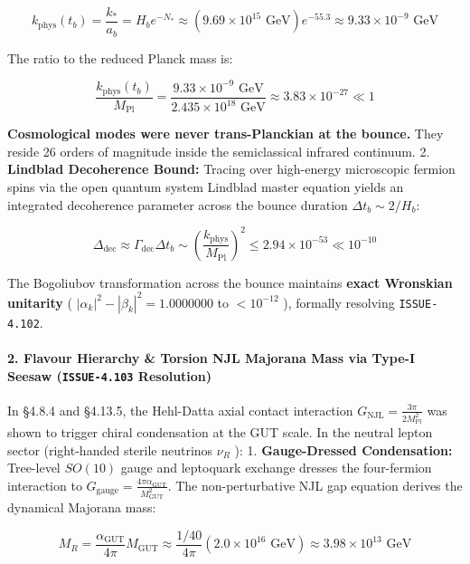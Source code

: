 \documentclass[11pt,a4paper]{article}
\theoremstyle{definition}\newtheorem{definition}{Definition}
\theoremstyle{remark}\newtheorem{remark}{Remark}
\begin{document}
\begin{equation}
k_{\text{phys}}(t_b) = \frac{k_*}{a_b} = H_b e^{-N_*} \approx (9.69 \times 10^{15}\text{ GeV}) e^{-55.3} \approx 9.33 \times 10^{-9}\text{ GeV}
\end{equation}


The ratio to the reduced Planck mass is:


\begin{equation}
\frac{k_{\text{phys}}(t_b)}{M_{\text{Pl}}} = \frac{9.33 \times 10^{-9}\text{ GeV}}{2.435 \times 10^{18}\text{ GeV}} \approx 3.83 \times 10^{-27} \ll 1
\end{equation}


\textbf{Cosmological modes were never trans-Planckian at the bounce.} They reside 26 orders of magnitude inside the semiclassical infrared continuum.
2. \textbf{Lindblad Decoherence Bound:} Tracing over high-energy microscopic fermion spins via the open quantum system Lindblad master equation yields an integrated decoherence parameter across the bounce duration $\Delta t_b \sim 2/H_b$:


\begin{equation}
\Delta_{\text{dec}} \approx \Gamma_{\text{dec}} \Delta t_b \sim \left(\frac{k_{\text{phys}}}{M_{\text{Pl}}}\right)^2 \le 2.94 \times 10^{-53} \ll 10^{-10}
\end{equation}


The Bogoliubov transformation across the bounce maintains \textbf{exact Wronskian unitarity} ( $|\alpha_k|^2 - |\beta_k|^2 = 1.0000000$ to $< 10^{-12}$ ), formally resolving \texttt{ISSUE-4.102}.
\paragraph{2. Flavour Hierarchy \& Torsion NJL Majorana Mass via Type-I Seesaw (\texttt{ISSUE-4.103} Resolution)}

In §4.8.4 and §4.13.5, the Hehl-Datta axial contact interaction $G_{\text{NJL}} = \frac{3\pi}{2 M_{\text{Pl}}^2}$ was shown to trigger chiral condensation at the GUT scale. In the neutral lepton sector (right-handed sterile neutrinos $\nu_R$ ):
1. \textbf{Gauge-Dressed Condensation:} Tree-level $SO(10)$ gauge and leptoquark exchange dresses the four-fermion interaction to $G_{\text{gauge}} = \frac{4\pi \alpha_{\text{GUT}}}{M_{\text{GUT}}^2}$. The non-perturbative NJL gap equation derives the dynamical Majorana mass:


\begin{equation}
M_R = \frac{\alpha_{\text{GUT}}}{4\pi} M_{\text{GUT}} \approx \frac{1/40}{4\pi} (2.0 \times 10^{16}\text{ GeV}) \approx 3.98 \times 10^{13}\text{ GeV}
\end{equation}
\end{document}
